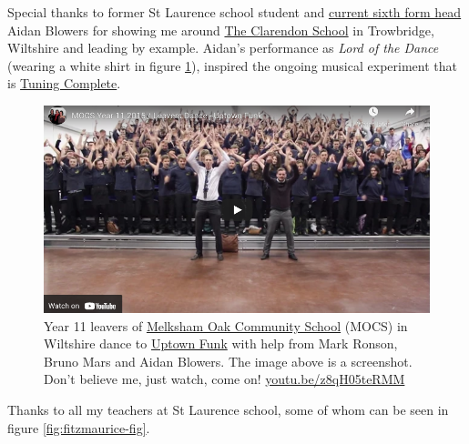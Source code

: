 \documentclass[
]{book}
\begin{document}
Special thanks to former St Laurence school student and \href{https://st-laurence.com/sixth-form}{current sixth form head} Aidan Blowers for showing me around \href{https://en.wikipedia.org/wiki/The_Clarendon_Academy}{The Clarendon School} in Trowbridge, Wiltshire and leading by example. Aidan's performance as \emph{Lord of the Dance} (wearing a white shirt in figure \ref{fig:uptown-funk-fig}), inspired the ongoing musical experiment that is \href{https://personalpages.manchester.ac.uk/staff/duncan.hull/research.html\#tuningcomplete}{Tuning Complete}.

\begin{figure}

{\centering \includegraphics[width=1\linewidth]{images/youtube-mocs-uptown-funk} 

}

\caption{Year 11 leavers of \href{https://en.wikipedia.org/wiki/Melksham_Oak_Community_School}{Melksham Oak Community School} (MOCS) in Wiltshire dance to \href{https://en.wikipedia.org/wiki/Uptown_Funk}{Uptown Funk} with help from Mark Ronson, Bruno Mars and Aidan Blowers. The image above is a screenshot. Don't believe me, just watch, come on! \href{https://youtu.be/z8qH05teRMM}{youtu.be/z8qH05teRMM}}\label{fig:uptown-funk-fig}
\end{figure}



Thanks to all my teachers at St Laurence school, some of whom can be seen in figure \ref{fig:fitzmaurice-fig}.
\end{document}
